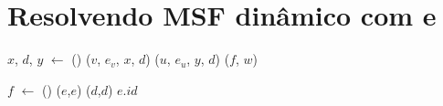 \section{Resolvendo MSF dinâmico com \LCOSplice{} e \LCOMakeEdge{}}

\begin{algorithm}[htb]
\caption{\MSFaddEdge($v$, $e_v$, $u$, $e_u$)}
\label{Algo:MSFaddEdge}
\begin{algorithmic}[1]
\State $x$, $d$, $y$ $\gets$ \LCOMakeEdge()
\State \LCOSplice($v$, $e_v$, $x$, $d$)
\State \LCOSplice($u$, $e_u$, $y$, $d$)
\State \MSFupdate($f$, $w$)
\end{algorithmic}
\end{algorithm}


\begin{algorithm}[htb]
\caption{\MSFdelEdge($e$, $d$)}
\label{Algo:MSFdelEdge}
\begin{algorithmic}[1]
\State $f$ $\gets$ \LCOMakeEdge()
\State \LCOSplice($e$,$e$)
\State \LCOSplice($d$,$d$)
\State \Return $e$.$id$ 
\end{algorithmic}
\end{algorithm}

